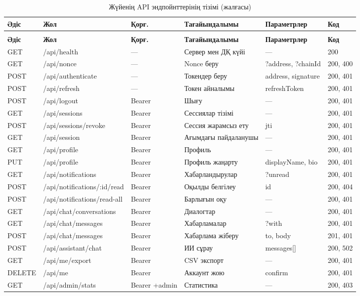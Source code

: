 \documentclass[14pt,a4paper]{extarticle}
\begin{document}
\small
\begin{longtable}{|p{1.2cm}|p{3.8cm}|p{1.8cm}|p{3.5cm}|p{2.7cm}|p{1.4cm}|}
\caption{Жүйенің API эндпойнттерінің тізімі}\label{tab:api}\\\hline
\textbf{Әдіс} & \textbf{Жол} & \textbf{Қорғ.} & \textbf{Тағайындалымы} & \textbf{Параметрлер} & \textbf{Код}\\\hline
\endfirsthead
\caption{Жүйенің API эндпойнттерінің тізімі (жалғасы)}\\\hline
\textbf{Әдіс} & \textbf{Жол} & \textbf{Қорғ.} & \textbf{Тағайындалымы} & \textbf{Параметрлер} & \textbf{Код}\\\hline
\endhead
GET & /api/health & --- & Сервер мен ДҚ күйі & --- & 200\\\hline
GET & /api/nonce & --- & Nonce беру & ?address, ?chainId & 200, 400\\\hline
POST & /api/authenticate & --- & Токендер беру & address, signature & 200, 401\\\hline
POST & /api/refresh & --- & Токен айналымы & refreshToken & 200, 401\\\hline
POST & /api/logout & Bearer & Шығу & --- & 200, 401\\\hline
GET & /api/sessions & Bearer & Сессиялар тізімі & --- & 200, 401\\\hline
POST & /api/sessions/revoke & Bearer & Сессия жарамсыз ету & jti & 200, 401\\\hline
GET & /api/session & Bearer & Ағымдағы пайдаланушы & --- & 200, 401\\\hline
GET & /api/profile & Bearer & Профиль & --- & 200, 401\\\hline
PUT & /api/profile & Bearer & Профиль жаңарту & displayName, bio & 200, 401\\\hline
GET & /api/notifications & Bearer & Хабарландырулар & ?unread & 200, 401\\\hline
POST & /api/notifications/:id/read & Bearer & Оқылды белгілеу & id & 200, 404\\\hline
POST & /api/notifications/read-all & Bearer & Барлығын оқу & --- & 200, 401\\\hline
GET & /api/chat/conversations & Bearer & Диалогтар & --- & 200, 401\\\hline
GET & /api/chat/messages & Bearer & Хабарламалар & ?with & 200, 401\\\hline
POST & /api/chat/messages & Bearer & Хабарлама жіберу & to, body & 201, 401\\\hline
POST & /api/assistant/chat & Bearer & ИИ сұрау & messages[] & 200, 502\\\hline
GET & /api/me/export & Bearer & CSV экспорт & --- & 200, 401\\\hline
DELETE & /api/me & Bearer & Аккаунт жою & confirm & 200, 401\\\hline
GET & /api/admin/stats & Bearer +admin & Статистика & --- & 200, 403\\\hline
\end{longtable}
\normalsize
\end{document}
